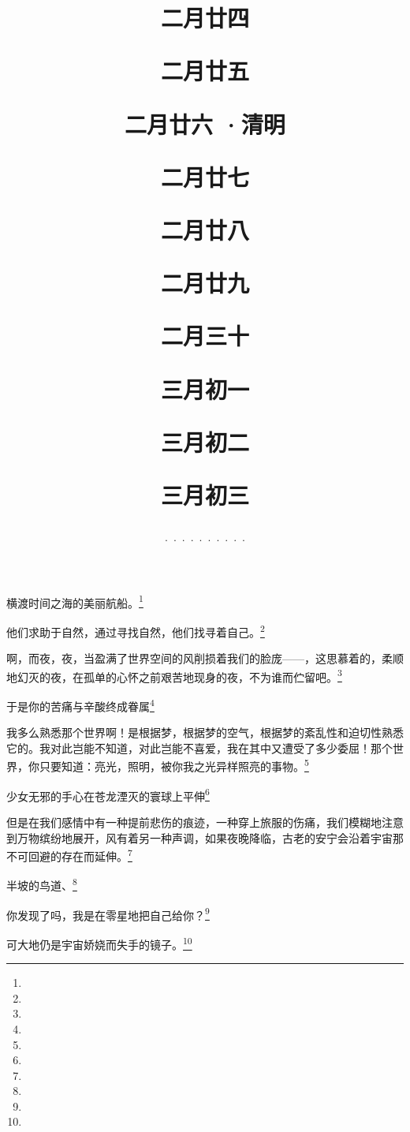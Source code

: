 \title{\date[d=2,m=4,y=2024][year:cn-y,年,month:cn,day:cn,日,·,weekday]·二月廿四 }
横渡时间之海的美丽航船。\footnote{ }

\title{\date[d=3,m=4,y=2024][year:cn-y,年,month:cn,day:cn,日,·,weekday]·二月廿五 }
他们求助于自然，通过寻找自然，他们找寻着自己。\footnote{ }

\title{\date[d=4,m=4,y=2024][year:cn-y,年,month:cn,day:cn,日,·,weekday]·二月廿六 ·清明}
啊，而夜，夜，当盈满了世界空间的风削损着我们的脸庞——，这思慕着的，柔顺地幻灭的夜，在孤单的心怀之前艰苦地现身的夜，不为谁而伫留吧。\footnote{ }

\title{\date[d=5,m=4,y=2024][year:cn-y,年,month:cn,day:cn,日,·,weekday]·二月廿七 }
于是你的苦痛与辛酸终成眷属\footnote{ }

\title{\date[d=6,m=4,y=2024][year:cn-y,年,month:cn,day:cn,日,·,weekday]·二月廿八 }
我多么熟悉那个世界啊！是根据梦，根据梦的空气，根据梦的紊乱性和迫切性熟悉它的。我对此岂能不知道，对此岂能不喜爱，我在其中又遭受了多少委屈！那个世界，你只要知道：亮光，照明，被你我之光异样照亮的事物。\footnote{ }

\title{\date[d=7,m=4,y=2024][year:cn-y,年,month:cn,day:cn,日,·,weekday]·二月廿九 }
少女无邪的手心在苍龙湮灭的寰球上平伸\footnote{ }

\title{\date[d=8,m=4,y=2024][year:cn-y,年,month:cn,day:cn,日,·,weekday]·二月三十 }
但是在我们感情中有一种提前悲伤的痕迹，一种穿上旅服的伤痛，我们模糊地注意到万物缤纷地展开，风有着另一种声调，如果夜晚降临，古老的安宁会沿着宇宙那不可回避的存在而延伸。\footnote{ }

\title{\date[d=9,m=4,y=2024][year:cn-y,年,month:cn,day:cn,日,·,weekday]·三月初一 }
半坡的鸟道、\footnote{ }

\title{\date[d=10,m=4,y=2024][year:cn-y,年,month:cn,day:cn,日,·,weekday]·三月初二 }
你发现了吗，我是在零星地把自己给你？\footnote{ }

\title{\date[d=11,m=4,y=2024][year:cn-y,年,month:cn,day:cn,日,·,weekday]·三月初三 }
可大地仍是宇宙娇娆而失手的镜子。\footnote{ }

